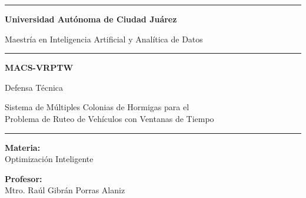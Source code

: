 \documentclass[12pt, letterpaper]{article}
\begin{document}
\begin{titlepage}
  \begin{center}

    \vspace*{0.3cm}


    \vspace{0.3cm}

    {\color{azulUACJ}\rule{\textwidth}{2pt}}

    \vspace{0.4cm}

    {\LARGE\bfseries\color{azulUACJ}
      Universidad Autónoma de Ciudad Juárez}

    \vspace{0.2cm}

    {\large\color{azulUACJ}
      Maestría en Inteligencia Artificial y Analítica de Datos}

    \vspace{0.2cm}

    {\color{oroUACJ}\rule{0.6\textwidth}{1pt}}

    \vspace{0.6cm}

    {\Huge\bfseries\color{azulUACJ}
      MACS-VRPTW}

    \vspace{0.3cm}

    {\Large\color{azulUACJ}
      Defensa Técnica}

    \vspace{0.3cm}

    {\large\color{grisUACJ}
      Sistema de Múltiples Colonias de Hormigas para el\\
      Problema de Ruteo de Vehículos con Ventanas de Tiempo}

    \vspace{0.6cm}

    {\color{oroUACJ}\rule{0.6\textwidth}{1pt}}

    \vspace{0.4cm}

    {\large\bfseries\color{azulUACJ} Materia:}\\[0.1cm]
    {\large Optimización Inteligente}

    \vspace{0.4cm}

    {\large\bfseries\color{azulUACJ} Profesor:}\\[0.1cm]
    {\large Mtro. Raúl Gibrán Porras Alaniz}


\end{center}
\end{titlepage}
\end{document}
